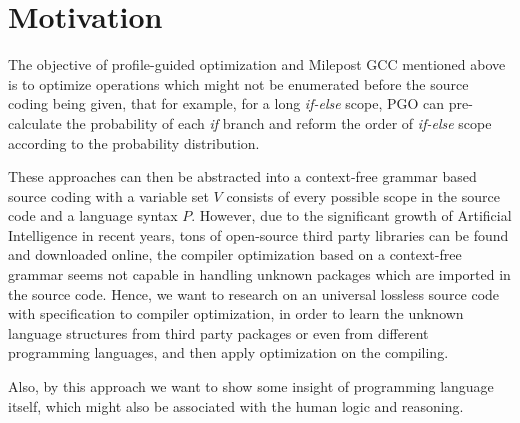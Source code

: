 \documentclass[12pt]{article}
\begin{document}
	\section{Motivation}  
	The objective of profile-guided optimization and Milepost GCC mentioned above is to optimize operations which might not be enumerated before the source coding being given, that for example, for a long \textit{if-else} scope, PGO can pre-calculate the probability of each \textit{if} branch and reform the order of \textit{if-else} scope according to the probability distribution. \par 
	These approaches can then be abstracted into a context-free grammar based source coding with a variable set $V$ consists of every possible scope in the source code and a language syntax $P$. However, due to the significant growth of Artificial Intelligence in recent years, tons of open-source third party libraries can be found and downloaded online, the compiler optimization based on a context-free grammar seems not capable in handling unknown packages which are imported in the source code. Hence, we want to research on an universal lossless source code with specification to compiler optimization, in order to learn the unknown language structures from third party packages or even from different programming languages, and then apply optimization on the compiling.  \par 
	Also, by this approach we want to show some insight of programming language itself, which might also be associated with the human logic and reasoning.
	
\end{document}
